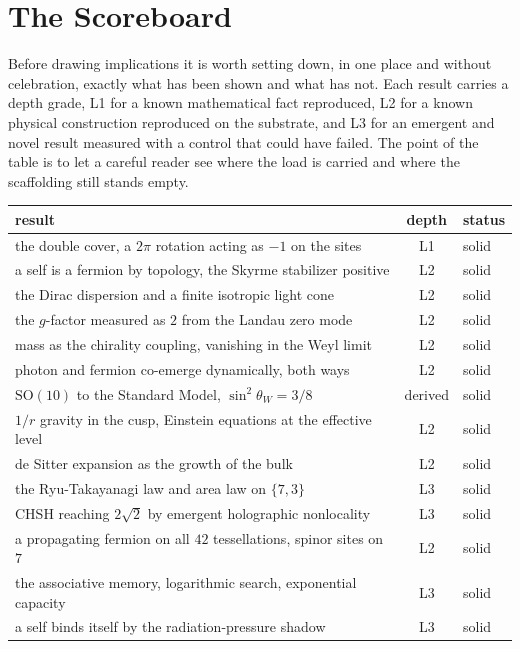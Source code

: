 \section{The Scoreboard}

Before drawing implications it is worth setting down, in one place and without celebration, exactly what has been shown and what has not. Each result carries a depth grade, L1 for a known mathematical fact reproduced, L2 for a known physical construction reproduced on the substrate, and L3 for an emergent and novel result measured with a control that could have failed. The point of the table is to let a careful reader see where the load is carried and where the scaffolding still stands empty.

\begin{table}[ht]
\centering
\small
\begin{tabular}{@{}p{}cl@{}}
\toprule
result & depth & status \\
\midrule
the double cover, a $2\pi$ rotation acting as $-1$ on the sites & L1 & solid \\
a self is a fermion by topology, the Skyrme stabilizer positive & L2 & solid \\
the Dirac dispersion and a finite isotropic light cone & L2 & solid \\
the $g$-factor measured as $2$ from the Landau zero mode & L2 & solid \\
mass as the chirality coupling, vanishing in the Weyl limit & L2 & solid \\
photon and fermion co-emerge dynamically, both ways & L2 & solid \\
$\mathrm{SO}(10)$ to the Standard Model, $\sin^2\theta_W = 3/8$ & derived & solid \\
$1/r$ gravity in the cusp, Einstein equations at the effective level & L2 & solid \\
de Sitter expansion as the growth of the bulk & L2 & solid \\
the Ryu-Takayanagi law and area law on $\{7,3\}$ & L3 & solid \\
CHSH reaching $2\sqrt{2}$ by emergent holographic nonlocality & L3 & solid \\
a propagating fermion on all $42$ tessellations, spinor sites on $7$ & L2 & solid \\
the associative memory, logarithmic search, exponential capacity & L3 & solid \\
a self binds itself by the radiation-pressure shadow & L3 & solid \\

\end{tabular}
\end{table}

